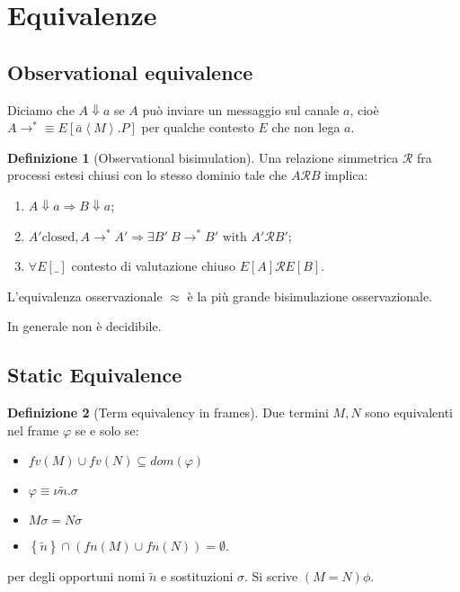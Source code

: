 \documentclass[a4paper,12pt]{article}
\theoremstyle{plain}
\theoremstyle{definition}
\newtheorem{mydef}{Definizione}[section]
\theoremstyle{remark}
\newcommand{\set}[1]{\left\{#1\right\}}
\newcommand{\pa}[1]{\left(#1\right)}
\newcommand{\ang}[1]{\left<#1\right>}
\newcommand{\bra}[1]{\left[#1\right]}
\begin{document}
\section{Equivalenze}

\subsection{Observational equivalence}

Diciamo che $A \Downarrow a$ se $A$ pu\`o inviare un messaggio sul
canale $a$, cio\`e $A \rightarrow ^* \equiv E\bra{\bar a \ang{M} .P}$
per qualche contesto $E$ che non lega $a$.

\begin{mydef}[Observational bisimulation]
  Una relazione simmetrica $\mathcal{R}$ fra processi estesi chiusi
  con lo stesso dominio tale che $A \mathcal{R} B$ implica:
  \begin{enumerate}
  \item $A \Downarrow a \Rightarrow B \Downarrow a$;
  \item $A' \text{closed}, A \rightarrow ^* A' \Rightarrow \exists B'\
    B \rightarrow ^* B' \text{ with } A' \mathcal{R} B'$;
  \item $\forall E[\_]$ contesto di valutazione chiuso $E[A]
    \mathcal{R} E[B]$.
  \end{enumerate}
\end{mydef}

L'equivalenza osservazionale $\approx$ \`e la pi\`u grande
bisimulazione osservazionale.

In generale non \`e decidibile.

\subsection{Static Equivalence}

\begin{mydef}[Term equivalency in frames]
  Due termini $M,N$ sono equivalenti nel frame $\varphi$ se e solo se:
  \begin{itemize}
  \item $fv(M) \cup fv(N) \subseteq dom(\varphi)$
  \item $\varphi \equiv \nu \tilde n. \sigma$
  \item $M\sigma = N \sigma$
  \item $\set{\tilde n} \cap \pa{ fn(M) \cup fn(N)} = \emptyset$.
  \end{itemize}
  per degli opportuni nomi $\tilde n$ e sostituzioni $\sigma$. Si
  scrive $\pa{M=N}\phi$.
\end{mydef}
\end{document}
